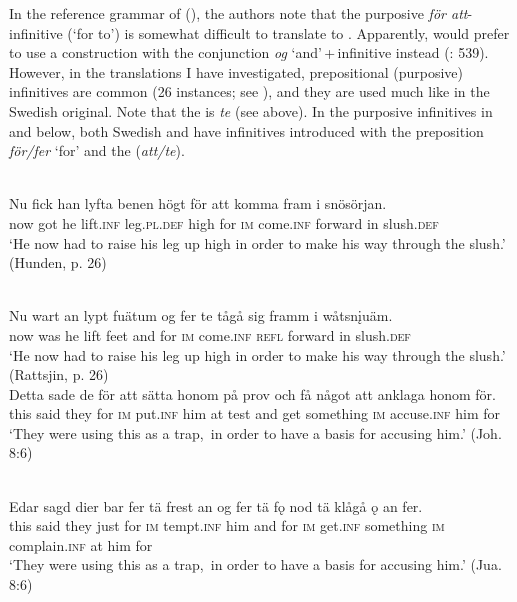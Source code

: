 \documentclass[output=paper]{langscibook}
\begin{document}
In the reference grammar of  (\citealt{AkerbergNystrom2012}), the authors note that the purposive \textit{för att}{}-infinitive (‘for to’) is somewhat difficult to translate to . Apparently,  would prefer to use a construction with the conjunction \textit{og} ‘and’\,+\,infinitive instead (\citealt{AkerbergNystrom2012}: 539). However, in the translations I have investigated, prepositional (purposive) infinitives are common (26 instances; see ), and they are used much like in the Swedish original. Note that the   is \textit{te} (see  above). In the purposive infinitives in  and  below, both Swedish and  have infinitives introduced with the preposition \textit{för/fer} ‘for’ and the  (\textit{att/te}).


\ea
\label{ex:kalm:15}
\ea {}\\\label{ex:kalm:15a}
\gll Nu fick han lyfta benen högt för att komma fram i snösörjan.\\
now got he lift.\textsc{inf} leg.\textsc{pl.def} high for \textsc{im} come.\textsc{inf} forward in slush.\textsc{def}\\ 
\glt ‘He now had to raise his leg up high in order to make his way through the slush.’ (Hunden, p. 26)

\ex {}\\\label{ex:kalm:15b}
\gll Nu wart an lypt fuätum og fer te tågå sig framm i wåtsn\k{i}uäm.\\
now was he lift feet and for \textsc{im} come.\textsc{inf} \textsc{refl} forward in slush.\textsc{def}\\
\glt ‘He now had to raise his leg up high in order to make his way through the slush.’ (Rattsjin, p. 26)
\z 
\ex
\label{ex:kalm:16}
\ea {}\\\label{ex:kalm:16a}
\gll Detta sade de för att sätta honom på prov och få något att anklaga honom för.\\
this said they for \textsc{im} put.\textsc{inf} him at test and get something \textsc{im} accuse.\textsc{inf} him for\\
\glt ‘They were using this  as a trap,{~}in order to have a basis for accusing him.’ (Joh. 8:6)

\ex {}\\\label{ex:kalm:16b}
\gll Edar sagd dier bar fer tä frest an og fer tä fǫ nod tä klågå ǫ an fer.\\
this said they just for \textsc{im} tempt.\textsc{inf} him and for \textsc{im} get.\textsc{inf} something \textsc{im} complain.\textsc{inf} at him for\\
\glt ‘They were using this  as a trap,{~}in order to have a basis for accusing him.’ (Jua. 8:6)
\z 
\z 
\end{document}
